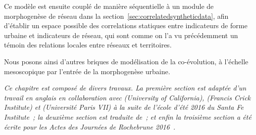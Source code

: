 Ce modèle est ensuite couplé de manière séquentielle à un module de morphogenèse de réseau dans la section~\ref{sec:correlatedsyntheticdata}, afin d'établir un espace possible des correlations statiques entre indicateurs de forme urbaine et indicateurs de réseau, qui sont comme on l'a vu précédemment un témoin des relations locales entre réseaux et territoires.


Nous posons ainsi d'autres briques de modélisation de la co-évolution, à l'échelle mesoscopique par l'entrée de la morphogenèse urbaine.




\stars


\textit{Ce chapitre est composé de divers travaux. La première section est adaptée d'un travail en anglais en collaboration avec  (University of California),  (Francis Crick Institute) et  (Université Paris VII) à la suite de l'école d'été 2016 du Santa Fe Institute~\cite{antelope2016interdisciplinary}; la deuxième section est traduite de~\cite{raimbault2017calibration}; et enfin la troisième section a été écrite pour les Actes des Journées de Rochebrune 2016~\cite{raimbault2016generation}.}

















